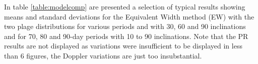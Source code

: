 In table \ref{table:modelcomp} are presented a selection of typical results showing means and standard deviations
for the Equivalent Width method (EW) with the two plage distributions for various periods and with 30{\degree},
60{\degree} and 90{\degree} inclinations and for 70, 80 and 90-day periods with 10{\degree} to 90{\degree} inclinations.
Note that the PR results are not displayed as variations were insufficient to be displayed in less than 6 figures, the
Doppler variations are just too insubstantial.

\begin{table}[!htbp]
\centering
{}

\vspace{5 mm}


\end{table}
